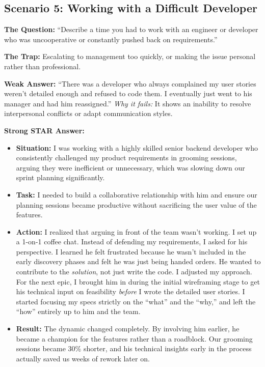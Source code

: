 \documentclass[
  11pt,
  openany,
  oneside]{book}
\providecommand{\tightlist}{%
  \setlength{\itemsep}{0pt}\setlength{\parskip}{0pt}}
\begin{document}
\subsection{Scenario 5: Working with a Difficult
Developer}\label{scenario-5-working-with-a-difficult-developer}

\textbf{The Question:} ``Describe a time you had to work with an
engineer or developer who was uncooperative or constantly pushed back on
requirements.''

\textbf{The Trap:} Escalating to management too quickly, or making the
issue personal rather than professional.

\textbf{Weak Answer:} ``There was a developer who always complained my
user stories weren't detailed enough and refused to code them. I
eventually just went to his manager and had him reassigned.'' \emph{Why
it fails:} It shows an inability to resolve interpersonal conflicts or
adapt communication styles.

\textbf{Strong STAR Answer:}

\begin{itemize}
\tightlist
\item
  \textbf{Situation:} I was working with a highly skilled senior backend
  developer who consistently challenged my product requirements in
  grooming sessions, arguing they were inefficient or unnecessary, which
  was slowing down our sprint planning significantly.
\item
  \textbf{Task:} I needed to build a collaborative relationship with him
  and ensure our planning sessions became productive without sacrificing
  the user value of the features.
\item
  \textbf{Action:} I realized that arguing in front of the team wasn't
  working. I set up a 1-on-1 coffee chat. Instead of defending my
  requirements, I asked for his perspective. I learned he felt
  frustrated because he wasn't included in the early discovery phases
  and felt he was just being handed orders. He wanted to contribute to
  the \emph{solution}, not just write the code. I adjusted my approach.
  For the next epic, I brought him in during the initial wireframing
  stage to get his technical input on feasibility \emph{before} I wrote
  the detailed user stories. I started focusing my specs strictly on the
  ``what'' and the ``why,'' and left the ``how'' entirely up to him and
  the team.
\item
  \textbf{Result:} The dynamic changed completely. By involving him
  earlier, he became a champion for the features rather than a
  roadblock. Our grooming sessions became 30\% shorter, and his
  technical insights early in the process actually saved us weeks of
  rework later on.
\end{itemize}
\end{document}
